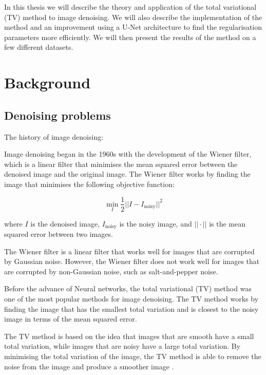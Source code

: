 \documentclass[12pt]{article}
\begin{document}
In this thesis we will describe the theory and application of the total variational (TV) method to image denoising. 
We will also describe the implementation of the method and an improvement using a U-Net architecture to find the regularisation parameters more efficiently. 
We will then present the results of the method on a few different datasets.


\section{Background}

\subsection{Denoising problems}

The history of image denoising: 

Image denoising began in the 1960s with the development of the Wiener filter, which is a linear filter that minimises the mean squared error between the denoised image and the original image.
The Wiener filter works by finding the image that minimises the following objective function:

\[
\min_{I} \frac{1}{2} ||I - I_{\text{noisy}}||^2
\]

where $I$ is the denoised image, $I_{\text{noisy}}$ is the noisy image, and $||\cdot||$ is the mean squared error between two images.

The Wiener filter is a linear filter that works well for images that are corrupted by Gaussian noise.
However, the Wiener filter does not work well for images that are corrupted by non-Gaussian noise, such as salt-and-pepper noise.

Before the advance of Neural networks, the total variational (TV) method was one of the most popular methods for image denoising.
The TV method works by finding the image that has the smallest total variation and is closest to the noisy image in terms of the mean squared error.

The TV method is based on the idea that images that are smooth have a small total variation, while images that are noisy have a large total variation.
By minimising the total variation of the image, the TV method is able to remove the noise from the image and produce a smoother image \cite{rudin1992nonlinear}.
\end{document}
